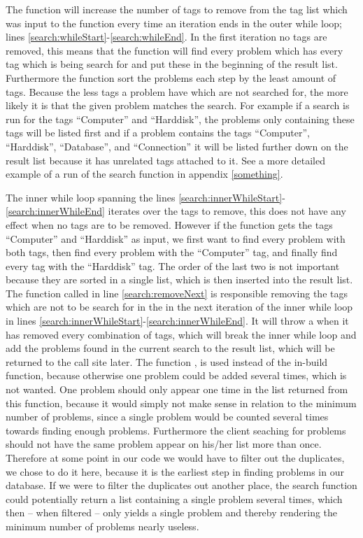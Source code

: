The function will increase the number of tags to remove from the tag list which was input to the function every time an iteration ends in the outer while loop; lines \ref{search:whileStart}-\ref{search:whileEnd}.
In the first iteration no tags are removed, this means that the function will find every problem which has every tag which is being search for and put these in the beginning of the result list.
Furthermore the function sort the problems each step by the least amount of tags. Because the less tags a problem have which are not searched for, the more likely it is that the given problem matches the search.
For example if a search is run for the tags ``Computer'' and ``Harddisk'', the problems only containing these tags will be listed first and if a problem contains the tags ``Computer'', ``Harddisk'', ``Database'', and ``Connection'' it will be listed further down on the result list because it has unrelated tags attached to it.
See a more detailed example of a run of the search function in appendix \ref{something}.

The inner while loop spanning the lines \ref{search:innerWhileStart}-\ref{search:innerWhileEnd} iterates over the tags to remove, this does not have any effect when no tags are to be removed.
However if the function gets the tags ``Computer'' and ``Harddisk'' as input, we first want to find every problem with both tags, then find every problem with the ``Computer'' tag, and finally find every tag with the ``Harddisk'' tag.
The order of the last two is not important because they are sorted in a single list, which is then inserted into the result list.
The  function called in line \ref{search:removeNext} is responsible removing the tags which are not to be search for in the in the next iteration of the inner while loop in lines \ref{search:innerWhileStart}-\ref{search:innerWhileEnd}.
It will throw a  when it has removed every combination of tags, which will break the inner while loop and add the problems found in the current search to the result list, which will be returned to the call site later.
The function , is used instead of the in-build  function, because otherwise one problem could be added several times, which is not wanted.
One problem should only appear one time in the list returned from this function, because it would simply not make sense in relation to the minimum number of problems, since a single problem would be counted several times towards finding enough problems.
Furthermore the client seaching for problems should not have the same problem appear on his/her list more than once.
Therefore at some point in our code we would have to filter out the duplicates, we chose to do it here, because it is the earliest step in finding problems in our database.
If we were to filter the duplicates out another place, the search function could potentially return a list containing a single problem several times, which then -- when filtered -- only yields a single problem and thereby rendering the minimum number of problems nearly useless.

